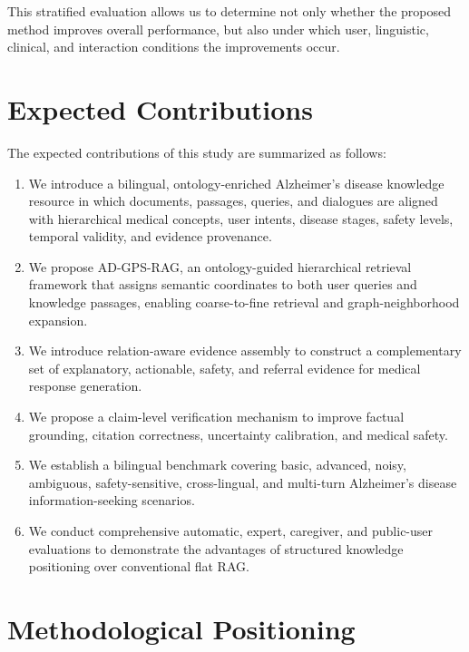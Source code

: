 \documentclass{article}
\begin{document}
This stratified evaluation allows us to determine not only whether the proposed method improves overall performance, but also under which user, linguistic, clinical, and interaction conditions the improvements occur.

\section{Expected Contributions}

The expected contributions of this study are summarized as follows:
\begin{enumerate}
    \item We introduce a bilingual, ontology-enriched Alzheimer's disease 
    knowledge resource in which documents, passages, queries, and dialogues are aligned with hierarchical medical concepts, user intents, disease stages, safety levels, temporal validity, and evidence provenance.

    \item We propose AD-GPS-RAG, an ontology-guided hierarchical retrieval framework that assigns semantic coordinates to both user queries and knowledge passages, enabling coarse-to-fine retrieval and graph-neighborhood expansion.

    \item We introduce relation-aware evidence assembly to construct a complementary set of explanatory, actionable, safety, and referral evidence for medical response generation.

    \item We propose a claim-level verification mechanism to improve factual grounding, citation correctness, uncertainty calibration, and medical 
    safety.

    \item We establish a bilingual benchmark covering basic, advanced, noisy, ambiguous, safety-sensitive, cross-lingual, and multi-turn Alzheimer's 
    disease information-seeking scenarios.

    \item We conduct comprehensive automatic, expert, caregiver, and public-user evaluations to demonstrate the advantages of structured knowledge 
    positioning over conventional flat RAG.
\end{enumerate}

\section{Methodological Positioning}
\end{document}
